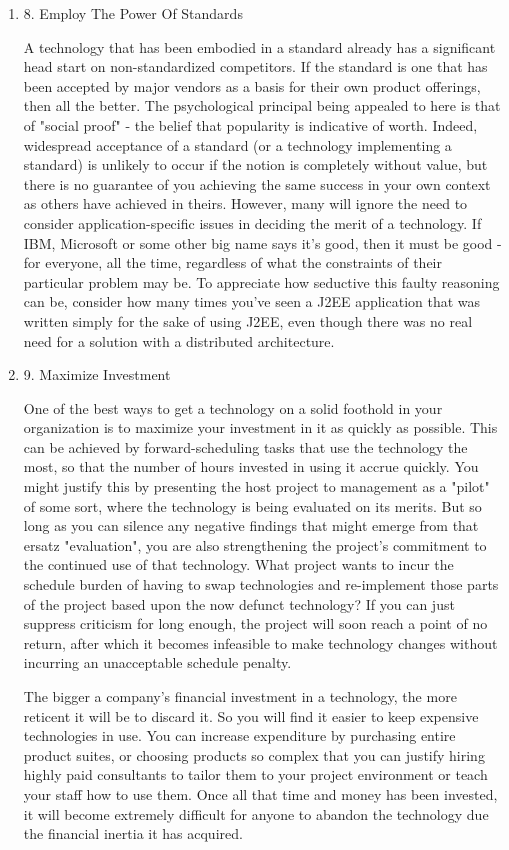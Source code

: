 \documentclass{article}
\begin{document}
\begin{enumerate}
\begin{enumerate}
\item 8. Employ The Power Of Standards
\label{sec:orgheadline44}

A technology that has been embodied in a standard already has a
significant head start on non-standardized competitors. If the standard
is one that has been accepted by major vendors as a basis for their own
product offerings, then all the better. The psychological principal
being appealed to here is that of "social proof" - the belief that
popularity is indicative of worth. Indeed, widespread acceptance of a
standard (or a technology implementing a standard) is unlikely to occur
if the notion is completely without value, but there is no guarantee of
you achieving the same success in your own context as others have
achieved in theirs. However, many will ignore the need to consider
application-specific issues in deciding the merit of a technology. If
IBM, Microsoft or some other big name says it's good, then it must be
good - for everyone, all the time, regardless of what the constraints of
their particular problem may be. To appreciate how seductive this faulty
reasoning can be, consider how many times you've seen a J2EE application
that was written simply for the sake of using J2EE, even though there
was no real need for a solution with a distributed architecture.

\item 9. Maximize Investment
\label{sec:orgheadline45}

One of the best ways to get a technology on a solid foothold in your
organization is to maximize your investment in it as quickly as
possible. This can be achieved by forward-scheduling tasks that use the
technology the most, so that the number of hours invested in using it
accrue quickly. You might justify this by presenting the host project to
management as a "pilot" of some sort, where the technology is being
evaluated on its merits. But so long as you can silence any negative
findings that might emerge from that ersatz "evaluation", you are also
strengthening the project's commitment to the continued use of that
technology. What project wants to incur the schedule burden of having to
swap technologies and re-implement those parts of the project based upon
the now defunct technology? If you can just suppress criticism for long
enough, the project will soon reach a point of no return, after which it
becomes infeasible to make technology changes without incurring an
unacceptable schedule penalty.

The bigger a company's financial investment in a technology, the more
reticent it will be to discard it. So you will find it easier to keep
expensive technologies in use. You can increase expenditure by
purchasing entire product suites, or choosing products so complex that
you can justify hiring highly paid consultants to tailor them to your
project environment or teach your staff how to use them. Once all that
time and money has been invested, it will become extremely difficult for
anyone to abandon the technology due the financial inertia it has
acquired.


\end{enumerate}
\end{enumerate}
\end{document}
